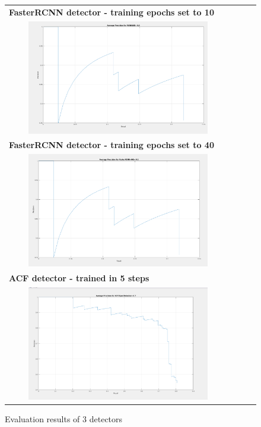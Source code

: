 \begin{figure}
\centering
    \begin{tabular}{lccc}
    \space\textbf{FasterRCNN detector - training epochs set to 10}\\
         \includegraphics[width=12cm, height=5cm]{images/Evalrcnn10E.png} \\
         \space \textbf{FasterRCNN detector - training epochs set to 40}\\
         \includegraphics[width=12cm, height=5cm]{images/EvalRCNN40E.png} \\
         \space\textbf{ACF detector - trained in 5 steps}\\
         \includegraphics[width=12cm, height=5cm]{images/EvalACF.png}
    \end{tabular}
    \caption{Evaluation results of 3 detectors}
    \label{fig:evaluation}
\end{figure}

